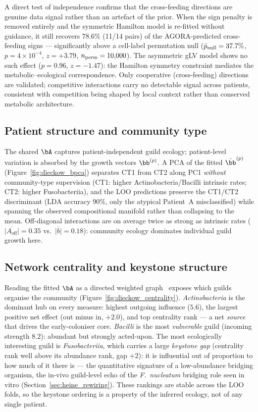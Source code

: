 A direct test of independence confirms that the cross-feeding directions are
genuine data signal rather than an artefact of the prior.  When the sign
penalty is removed entirely and the symmetric Hamilton model is re-fitted
without guidance, it still recovers $78.6\%$ (11/14 pairs) of the
AGORA-predicted cross-feeding signs --- significantly above a cell-label
permutation null ($\bar p_{\rm null}=37.7\%$,
$p=4\times10^{-4}$, $z=+3.79$, $n_{\rm perm}=10{,}000$).
The asymmetric gLV model shows no such effect ($p=0.96$, $z=-1.47$):
the Hamilton symmetry constraint mediates the metabolic--ecological
correspondence.  Only cooperative (cross-feeding) directions are validated;
competitive interactions carry no detectable signal across patients,
consistent with competition being shaped by local context rather than
conserved metabolic architecture.

\subsection{Patient structure and community type}
\label{sec:dieckow_struct}

The shared $\bA$ captures patient-independent guild ecology; patient-level
variation is absorbed by the growth vectors $\bb^{(p)}$. A PCA of the fitted
$\hat\bb^{(p)}$ (Figure~\ref{fig:dieckow_bpca}) separates CT1 from CT2 along PC1
\emph{without} community-type supervision (CT1: higher Actinobacteria/Bacilli
intrinsic rates; CT2: higher Fusobacteriia), and the LOO predictions preserve the
CT1/CT2 discriminant (LDA accuracy $90\%$, only the atypical Patient~A
misclassified) while spanning the observed compositional manifold rather than
collapsing to the mean. Off-diagonal interactions are on average twice as strong as
intrinsic rates ($\overline{|A_{\mathrm{off}}|}=0.35$ vs.\ $\overline{|b|}=0.18$):
community ecology dominates individual guild growth here.


\subsection{Network centrality and keystone structure}
\label{sec:dieckow_network}

Reading the fitted $\bA$ as a directed weighted graph~\cite{Freilich2020Inference, May1972Stability}
exposes which guilds organise the community (Figure~\ref{fig:dieckow_centrality}). \emph{Actinobacteria} is the
dominant hub on every measure: highest outgoing influence ($5.6$), the largest
positive net effect (out minus in, $+2.0$), and top centrality rank --- a net
\emph{source} that drives the early-coloniser core. \emph{Bacilli} is the most
\emph{vulnerable} guild (incoming strength $8.2$): abundant but strongly
acted-upon. The most ecologically interesting guild is \emph{Fusobacteriia}, which
carries a large \emph{keystone gap} (centrality rank well above its abundance rank,
gap $+2$): it is influential out of proportion to how much of it there is --- the
quantitative signature of a low-abundance bridging organism, the in-vivo guild-level
echo of the \textit{F.~nucleatum} bridging role seen in vitro
(Section~\ref{sec:heine_rewiring}). These rankings are stable across the LOO folds,
so the keystone ordering is a property of the inferred ecology, not of any single
patient.

